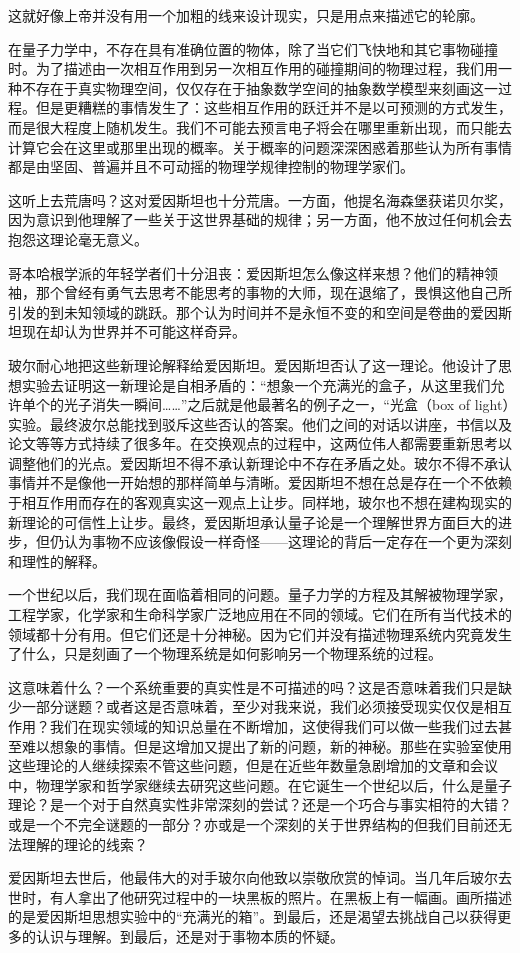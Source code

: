   这就好像上帝并没有用一个加粗的线来设计现实，只是用点来描述它的轮廓。

  在量子力学中，不存在具有准确位置的物体，除了当它们飞快地和其它事物碰撞时。为了描述由一次相互作用到另一次相互作用的碰撞期间的物理过程，我们用一种不存在于真实物理空间，仅仅存在于抽象数学空间的抽象数学模型来刻画这一过程。但是更糟糕的事情发生了：这些相互作用的跃迁并不是以可预测的方式发生，而是很大程度上随机发生。我们不可能去预言电子将会在哪里重新出现，而只能去计算它会在这里或那里出现的概率。关于概率的问题深深困惑着那些认为所有事情都是由坚固、普遍并且不可动摇的物理学规律控制的物理学家们。   

   这听上去荒唐吗？这对爱因斯坦也十分荒唐。一方面，他提名海森堡获诺贝尔奖，因为意识到他理解了一些关于这世界基础的规律；另一方面，他不放过任何机会去抱怨这理论毫无意义。

   哥本哈根学派的年轻学者们十分沮丧：爱因斯坦怎么像这样来想？他们的精神领袖，那个曾经有勇气去思考不能思考的事物的大师，现在退缩了，畏惧这他自己所引发的到未知领域的跳跃。那个认为时间并不是永恒不变的和空间是卷曲的爱因斯坦现在却认为世界并不可能这样奇异。

  玻尔耐心地把这些新理论解释给爱因斯坦。爱因斯坦否认了这一理论。他设计了思想实验去证明这一新理论是自相矛盾的：“想象一个充满光的盒子，从这里我们允许单个的光子消失一瞬间……”之后就是他最著名的例子之一，“光盒（box of light）实验。最终波尔总能找到驳斥这些否认的答案。他们之间的对话以讲座，书信以及论文等等方式持续了很多年。在交换观点的过程中，这两位伟人都需要重新思考以调整他们的光点。爱因斯坦不得不承认新理论中不存在矛盾之处。玻尔不得不承认事情并不是像他一开始想的那样简单与清晰。爱因斯坦不想在总是存在一个不依赖于相互作用而存在的客观真实这一观点上让步。同样地，玻尔也不想在建构现实的新理论的可信性上让步。最终，爱因斯坦承认量子论是一个理解世界方面巨大的进步，但仍认为事物不应该像假设一样奇怪——这理论的背后一定存在一个更为深刻和理性的解释。

  一个世纪以后，我们现在面临着相同的问题。量子力学的方程及其解被物理学家，工程学家，化学家和生命科学家广泛地应用在不同的领域。它们在所有当代技术的领域都十分有用。但它们还是十分神秘。因为它们并没有描述物理系统内究竟发生了什么，只是刻画了一个物理系统是如何影响另一个物理系统的过程。

  这意味着什么？一个系统重要的真实性是不可描述的吗？这是否意味着我们只是缺少一部分谜题？或者这是否意味着，至少对我来说，我们必须接受现实仅仅是相互作用？我们在现实领域的知识总量在不断增加，这使得我们可以做一些我们过去甚至难以想象的事情。但是这增加又提出了新的问题，新的神秘。那些在实验室使用这些理论的人继续探索不管这些问题，但是在近些年数量急剧增加的文章和会议中，物理学家和哲学家继续去研究这些问题。在它诞生一个世纪以后，什么是量子理论？是一个对于自然真实性非常深刻的尝试？还是一个巧合与事实相符的大错？或是一个不完全谜题的一部分？亦或是一个深刻的关于世界结构的但我们目前还无法理解的理论的线索？

  爱因斯坦去世后，他最伟大的对手玻尔向他致以崇敬欣赏的悼词。当几年后玻尔去世时，有人拿出了他研究过程中的一块黑板的照片。在黑板上有一幅画。画所描述的是爱因斯坦思想实验中的“充满光的箱”。到最后，还是渴望去挑战自己以获得更多的认识与理解。到最后，还是对于事物本质的怀疑。

\noindent

